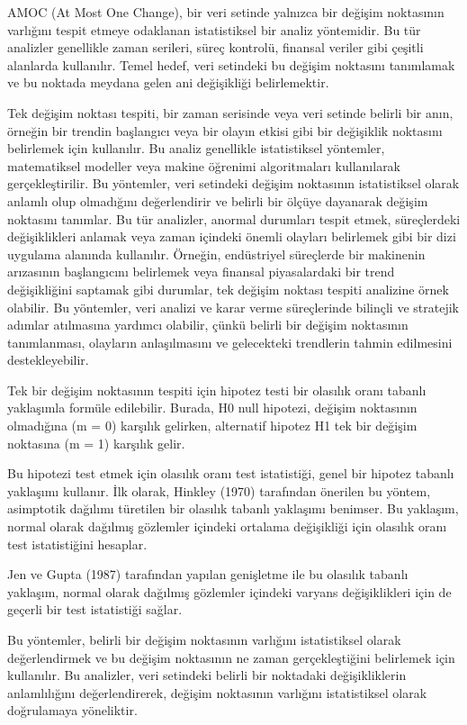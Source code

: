 \documentclass[12pt,twoside]{deuthesis}
\begin{document}
AMOC (At Most One Change), bir veri setinde yalnızca bir değişim noktasının varlığını tespit etmeye odaklanan istatistiksel bir analiz yöntemidir. Bu tür analizler genellikle zaman serileri, süreç kontrolü, finansal veriler gibi çeşitli alanlarda kullanılır. Temel hedef, veri setindeki bu değişim noktasını tanımlamak ve bu noktada meydana gelen ani değişikliği belirlemektir.

Tek değişim noktası tespiti, bir zaman serisinde veya veri setinde belirli bir anın, örneğin bir trendin başlangıcı veya bir olayın etkisi gibi bir değişiklik noktasını belirlemek için kullanılır. Bu analiz genellikle istatistiksel yöntemler, matematiksel modeller veya makine öğrenimi algoritmaları kullanılarak gerçekleştirilir. Bu yöntemler, veri setindeki değişim noktasının istatistiksel olarak anlamlı olup olmadığını değerlendirir ve belirli bir ölçüye dayanarak değişim noktasını tanımlar. Bu tür analizler, anormal durumları tespit etmek, süreçlerdeki değişiklikleri anlamak veya zaman içindeki önemli olayları belirlemek gibi bir dizi uygulama alanında kullanılır. Örneğin, endüstriyel süreçlerde bir makinenin arızasının başlangıcını belirlemek veya finansal piyasalardaki bir trend değişikliğini saptamak gibi durumlar, tek değişim noktası tespiti analizine örnek olabilir. Bu yöntemler, veri analizi ve karar verme süreçlerinde bilinçli ve stratejik adımlar atılmasına yardımcı olabilir, çünkü belirli bir değişim noktasının tanımlanması, olayların anlaşılmasını ve gelecekteki trendlerin tahmin edilmesini destekleyebilir.

Tek bir değişim noktasının tespiti için hipotez testi bir olasılık oranı tabanlı yaklaşımla formüle edilebilir. Burada, H0 null hipotezi, değişim noktasının olmadığına (m = 0) karşılık gelirken, alternatif hipotez H1 tek bir değişim noktasına (m = 1) karşılık gelir.

Bu hipotezi test etmek için olasılık oranı test istatistiği, genel bir hipotez tabanlı yaklaşımı kullanır. İlk olarak, Hinkley (1970) tarafından önerilen bu yöntem, asimptotik dağılımı türetilen bir olasılık tabanlı yaklaşımı benimser. Bu yaklaşım, normal olarak dağılmış gözlemler içindeki ortalama değişikliği için olasılık oranı test istatistiğini hesaplar.

Jen ve Gupta (1987) tarafından yapılan genişletme ile bu olasılık tabanlı yaklaşım, normal olarak dağılmış gözlemler içindeki varyans değişiklikleri için de geçerli bir test istatistiği sağlar.

Bu yöntemler, belirli bir değişim noktasının varlığını istatistiksel olarak değerlendirmek ve bu değişim noktasının ne zaman gerçekleştiğini belirlemek için kullanılır. Bu analizler, veri setindeki belirli bir noktadaki değişikliklerin anlamlılığını değerlendirerek, değişim noktasının varlığını istatistiksel olarak doğrulamaya yöneliktir.
\end{document}
